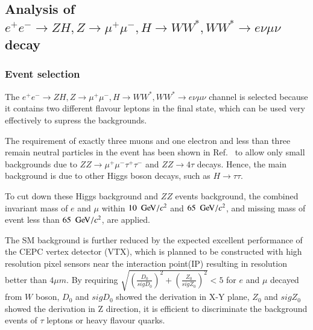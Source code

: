 \documentclass[11pt,a4paper]{cepcnote}
\begin{document}
\subsection{Analysis of $e^+e^-\rightarrow ZH, Z\rightarrow\mu^+\mu^-, H\rightarrow WW^*, WW^*\rightarrow e\nu\mu\nu$ decay}
\label{sec:uuevuv}
\subsubsection{Event selection}
The $e^+e^-\rightarrow ZH, Z\rightarrow\mu^+\mu^-, H\rightarrow WW^*, WW^*\rightarrow e\nu\mu\nu$ channel is selected because it contains
two different flavour leptons in the final state, which can be used very effectively to supress the backgrounds.

The requirement of exactly three muons and one electron {\color{blue}and less than three remain neutral particles} in the event has been
shown in Ref.~\cite{Mo:2015mza} to allow only small backgrounds
due to $ZZ\rightarrow \mu^+\mu^-\tau^+\tau^-$ and $ZZ\rightarrow 4\tau$ decays.
Hence, the main background is due to other Higgs boson decays, such as $H\to\tau\tau$.

{\color{blue} To cut down these Higgs background and $ZZ$ events background, the combined invariant mass of $e$ and $\mu$
within $10~\gev/c^2$ and $ 65~\gev/c^2$, and missing mass of event less than $65~\gev/c^2$, are applied.}

The SM background is further reduced by the expected excellent performance
of the CEPC vertex detector (VTX), which is planned to be 
constructed with high resolution pixel sensors near the interaction point(IP) 
resulting in resolution better than $4\mu m$.
{\color{blue}By requiring $\sqrt{(\frac{D_{0}}{sigD_{0}})^2+(\frac{Z_{0}}{sigZ_{0}})^2} < 5$ for $e$ and $\mu$ decayed from $W$ boson, 
$D_0$ and $sigD_0$ showed the derivation in X-Y plane, $Z_0$ and $sigZ_0$ showed the derivation in Z direction,
it is efficient to discriminate the background events of $\tau$ leptons or heavy flavour quarks.}
\end{document}
